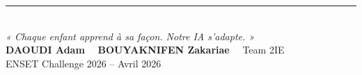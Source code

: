 \documentclass[11pt,a4paper]{article}
\begin{document}
\vspace{1em}

\begin{center}
{\color{rulecolor}\rule{6cm}{0.3pt}}\\[8pt]
{\small\color{ink}\itshape « Chaque enfant apprend à sa façon. Notre IA s'adapte. »}\\[8pt]
{\footnotesize\color{mute}\textbf{DAOUDI Adam} \ \textbar\  \textbf{BOUYAKNIFEN Zakariae} \ \textbar\  Team 2IE}\\
{\footnotesize\color{mute}ENSET Challenge 2026 -- Avril 2026}
\end{center}
\end{document}
